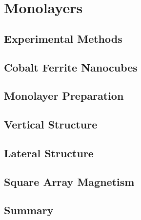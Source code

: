 \documentclass[\main/dresen_thesis.tex]{subfiles}
\renewcommand{\thisPath}{\main/chapters/monolayers}
\begin{document}
  \chapter{Monolayers}\label{ch:monolayers}
    

    \section{Experimental Methods}
      
        \FloatBarrier
        \clearpage

    \section{Cobalt Ferrite Nanocubes}
      
        \FloatBarrier
        \clearpage

    \section{Monolayer Preparation}
      
      \FloatBarrier
      \clearpage

    \section{Vertical Structure}
      
      \FloatBarrier

    \section{Lateral Structure}
      
      \FloatBarrier

    \section{Square Array Magnetism}
      \FloatBarrier

    \section{Summary}
      
      \FloatBarrier
\end{document}
